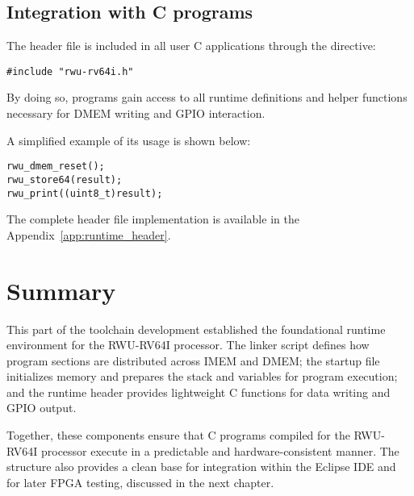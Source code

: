 \subsection*{Integration with C programs}

The header file is included in all user C applications through the directive:
\begin{verbatim}
#include "rwu-rv64i.h"
\end{verbatim}
By doing so, programs gain access to all runtime definitions and helper functions necessary for DMEM writing and GPIO interaction.

A simplified example of its usage is shown below:

\begin{verbatim}
rwu_dmem_reset();
rwu_store64(result);
rwu_print((uint8_t)result);
\end{verbatim}

The complete header file implementation is available in the Appendix~\ref{app:runtime_header}.

\section{Summary}
\label{sec:linker_summary}

This part of the toolchain development established the foundational runtime environment for the RWU-RV64I processor.  
The linker script defines how program sections are distributed across IMEM and DMEM;  
the startup file initializes memory and prepares the stack and variables for program execution;  
and the runtime header provides lightweight C functions for data writing and GPIO output.  

Together, these components ensure that C programs compiled for the RWU-RV64I processor execute in a predictable and hardware-consistent manner.  
The structure also provides a clean base for integration within the Eclipse IDE and for later FPGA testing, discussed in the next chapter.
